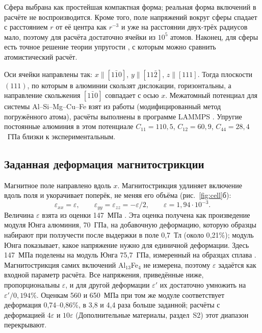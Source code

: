 \documentclass[11pt,a4paper]{article}
\begin{document}
Сфера выбрана как простейшая компактная форма; реальная форма включений
в расчёте не воспроизводится. Кроме того, поле
напряжений вокруг сферы спадает с расстоянием $r$ от её центра как
$r^{-3}$ и уже на расстоянии двух-трёх радиусов мало, поэтому для расчёта
достаточно ячейки из $10^5$ атомов. Наконец, для сферы есть точное решение теории
упругости \cite{Eshelby1957,Mura1987}, с которым можно сравнить
атомистический расчёт.

Оси ячейки направлены так: $x\parallel[1\bar10]$, $y\parallel[11\bar2]$,
$z\parallel[111]$. Тогда плоскости $(111)$, по которым в алюминии
скользят дислокации, горизонтальны, а направление скольжения
$[1\bar10]$ совпадает с осью $x$. Межатомный потенциал для системы
Al--Si--Mg--Cu--Fe взят из работы \cite{Jelinek2012} (модифицированный
метод погружённого атома), расчёты выполнены в программе LAMMPS
\cite{Thompson2022LAMMPS}. Упругие постоянные алюминия в этом
потенциале $C_{11}=110{,}5$, $C_{12}=60{,}9$, $C_{44}=28{,}4$~ГПа
близки к экспериментальным.

\subsection{Заданная деформация магнитострикции}
\label{sec:strain}

Магнитное поле направлено вдоль $x$. Магнитострикция удлиняет
включение вдоль поля и укорачивает поперёк, не меняя его объёма
(рис.~\ref{fig:cell}б):
\begin{equation}
\varepsilon_{xx}=\varepsilon,\qquad
\varepsilon_{yy}=\varepsilon_{zz}=-\varepsilon/2,\qquad
\varepsilon=1{,}94\cdot10^{-3}.
\label{eq:strain}
\end{equation}
Величина $\varepsilon$ взята из оценки 147~МПа \cite{Friha2024JMMM}. Эта
оценка получена как произведение модуля Юнга алюминия, 70~ГПа, на
добавочную деформацию, которую образцы набирают при ползучести после
выдержки в поле 0{,}7~Тл (около 0{,}21\%); модуль Юнга показывает,
какое напряжение нужно для единичной деформации. Здесь 147~МПа поделены
на модуль Юнга 75{,}7~ГПа, измеренный на образцах сплава
\cite{Pshonkin2025ZL}. Магнитострикция самих включений Al$_{13}$Fe$_4$ не
измерена, поэтому $\varepsilon$ задаётся как входной параметр расчёта. Все
напряжения, приведённые ниже, пропорциональны $\varepsilon$, и для другой
деформации $\varepsilon'$ их достаточно умножить на $\varepsilon'/0{,}194\%$.
Оценкам 560 и 650~МПа \cite{Skvortsov2019JAP,Friha2023PSS} при том же
модуле соответствует деформация 0{,}74--0{,}86\%, в 3{,}8 и 4{,}4 раза больше
заданной; расчёты с деформацией $4\varepsilon$ и $10\varepsilon$
(Дополнительные материалы, раздел~S2) этот диапазон перекрывают.
\end{document}
